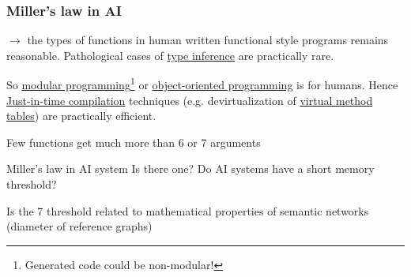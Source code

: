 \documentclass[xcolor=svgnames,final,smaller,a4]{beamer}
\begin{document}
 \begin{frame}
   \frametitle{Miller's law in AI}
   
   
   $\rightarrow$ the types of functions in human written functional
   style programs remains reasonable. Pathological cases of
   \href{https://en.wikipedia.org/wiki/Type_inference}{type inference}
   are practically rare.

   \medskip
   So \href{https://en.wikipedia.org/wiki/Modular_programming}{modular
     programming}\footnote{Generated code could be non-modular!} or
   \href{https://en.wikipedia.org/wiki/Object-oriented_programming}{object-oriented
     programming} is for humans. Hence
   \href{https://en.wikipedia.org/wiki/Just-in-time_compilation}{Just-in-time
     compilation} techniques (e.g. devirtualization of
   \href{https://en.wikipedia.org/wiki/Virtual_method_table}{virtual
     method tables}) are practically efficient.


   \medskip

   Few functions get much more than 6 or 7 arguments


   \begin{block}{Miller's law in AI system}
   Is there one? Do AI systems have a short memory threshold?

   Is the 7 threshold related to mathematical properties of semantic networks (diameter of reference graphs)
   \end{block}
   
 \end{frame}
\end{document}
